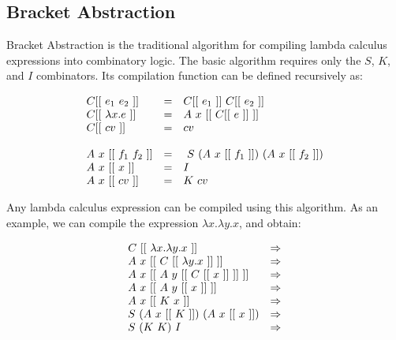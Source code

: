 \documentclass[conference]{IEEEtran}
\begin{document}
\subsection{Bracket Abstraction}
Bracket Abstraction is the traditional algorithm for compiling lambda calculus expressions into combinatory logic.
The basic algorithm requires only the $S$, $K$, and $I$ combinators.
Its compilation function can be defined recursively as:

\begin{equation*}
    \begin{array}{l l l}
        C [[\ e_1\ e_2\ ]]     & = & C [[\ e_1\ ]]\ C [[\ e_2\ ]]                  \\
        C [[\ \lambda x.e\ ]]  & = & A\ x\ [[\ C [[\ e\ ]]\ ]]                     \\
        C [[\ cv\ ]]           & = & cv                                            \\
        \\
        A\ x\ [[\ f_1\ f_2\ ]] & = & \ S\ (A\ x\ [[\ f_1\ ]])\ (A\ x\ [[\ f_2\ ]]) \\
        A\ x\ [[\ x\ ]]        & = & I                                             \\
        A\ x\ [[\ cv\ ]]       & = & K\ cv                                         \\
    \end{array}
\end{equation*}

Any lambda calculus expression can be compiled using this algorithm.
As an example, we can compile the expression $\lambda x.\lambda y. x$, and obtain:

\begin{equation*}
    \begin{array}{l l}
        C\ [[\ \lambda x.\lambda y. x\ ]]        & \Rightarrow \\
        A\ x\ [[\ C\ [[\ \lambda y. x\ ]]\ ]]    & \Rightarrow \\
        A\ x\ [[\ A\ y\ [[\ C\ [[\ x\ ]]\ ]]\ ]] & \Rightarrow \\
        A\ x\ [[\ A\ y\ [[\ x\ ]]\ ]]            & \Rightarrow \\
        A\ x\ [[\ K\ x\ ]]                       & \Rightarrow \\
        S\ (A\ x\ [[\ K\ ]])\ (A\ x\ [[\ x\ ]])  & \Rightarrow \\
        S\ (K\ K)\ I                             & \Rightarrow \\
    \end{array}
\end{equation*}
\end{document}
